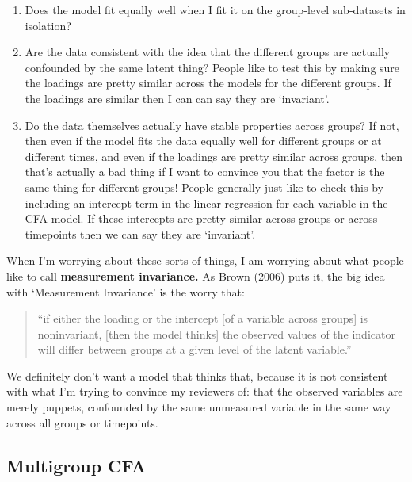 \documentclass[
  letterpaper,
  DIV=11,
  numbers=noendperiod]{scrreprt}
\providecommand{\tightlist}{%
  \setlength{\itemsep}{0pt}\setlength{\parskip}{0pt}}\usepackage{longtable,booktabs,array}
\begin{document}
\begin{enumerate}
\def\labelenumi{\arabic{enumi}.}
\tightlist
\item
  Does the model fit equally well when I fit it on the group-level
  sub-datasets in isolation?
\item
  Are the data consistent with the idea that the different groups are
  actually confounded by the same latent thing? People like to test this
  by making sure the loadings are pretty similar across the models for
  the different groups. If the loadings are similar then I can can say
  they are `invariant'.
\item
  Do the data themselves actually have stable properties across groups?
  If not, then even if the model fits the data equally well for
  different groups or at different times, and even if the loadings are
  pretty similar across groups, then that's actually a bad thing if I
  want to convince you that the factor is the same thing for different
  groups! People generally just like to check this by including an
  intercept term in the linear regression for each variable in the CFA
  model. If these intercepts are pretty similar across groups or across
  timepoints then we can say they are `invariant'.
\end{enumerate}

When I'm worrying about these sorts of things, I am worrying about what
people like to call \textbf{measurement invariance.} As Brown (2006)
puts it, the big idea with `Measurement Invariance' is the worry that:

\begin{quote}
``if either the loading or the intercept {[}of a variable across
groups{]} is noninvariant, {[}then the model thinks{]} the observed
values of the indicator will differ between groups at a given level of
the latent variable.''
\end{quote}

We definitely don't want a model that thinks that, because it is not
consistent with what I'm trying to convince my reviewers of: that the
observed variables are merely puppets, confounded by the same unmeasured
variable in the same way across all groups or timepoints.

\hypertarget{multigroup-cfa}{%
\subsection*{Multigroup CFA}\label{multigroup-cfa}}
\end{document}
